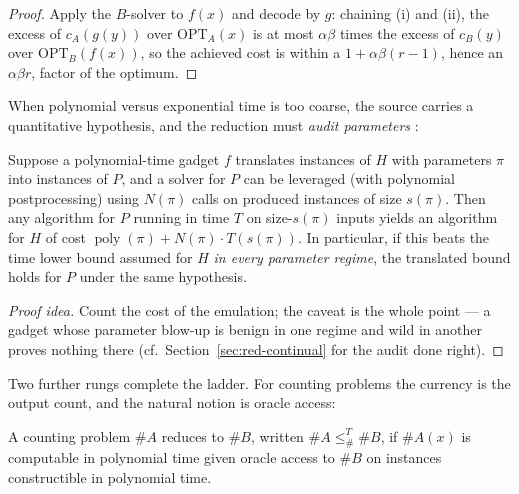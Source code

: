 \begin{proof}
Apply the $B$-solver to $f(x)$ and decode by $g$: chaining (i) and (ii), the excess of
$c_A(g(y))$ over $\mathrm{OPT}_A(x)$ is at most $\alpha\beta$ times the excess of
$c_B(y)$ over $\mathrm{OPT}_B(f(x))$, so the achieved cost is within a $1 +
\alpha\beta(r-1)$, hence an $\alpha\beta r$, factor of the optimum.
\end{proof}


When polynomial versus exponential time is too coarse, the source carries a quantitative
hypothesis, and the reduction must \emph{audit parameters} \citep{reduction-bg5}:

\begin{proposition}\label{prop:red-fine}
Suppose a polynomial-time gadget $f$ translates instances of $H$ with parameters $\pi$
into instances of $P$, and a solver for $P$ can be leveraged (with polynomial
postprocessing) using $N(\pi)$ calls on produced instances of size $s(\pi)$. Then any
algorithm for $P$ running in time $T$ on size-$s(\pi)$ inputs yields an algorithm for
$H$ of cost $\operatorname{poly}(\pi) + N(\pi)\cdot T(s(\pi))$. In particular, if this
beats the time lower bound assumed for $H$ \emph{in every parameter regime}, the
translated bound holds for $P$ under the same hypothesis. \eop
\end{proposition}

\begin{proof}[Proof idea]
Count the cost of the emulation; the caveat is the whole point --- a gadget whose
parameter blow-up is benign in one regime and wild in another proves nothing there
(cf.\ Section~\ref{sec:red-continual} for the audit done right).
\end{proof}

Two further rungs complete the ladder. For counting problems the currency is the output
count, and the natural notion is oracle access:

\begin{definition}\label{def:red-count}
A counting problem $\#A$ reduces to $\#B$, written $\#A \le_\#^T \#B$, if $\#A(x)$ is
computable in polynomial time given oracle access to $\#B$ on instances constructible
in polynomial time. \eop
\end{definition}

